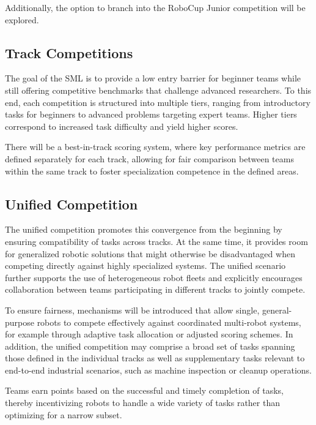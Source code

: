 \documentclass[letterpaper, 11pt]{extarticle}
\begin{document}
Additionally, the option to branch into the RoboCup Junior competition will be explored.

\subsection{Track Competitions}
The goal of the SML is to provide a low entry barrier for beginner teams while still offering competitive benchmarks that challenge advanced researchers. To this end, each competition is structured into multiple tiers, ranging from introductory tasks for beginners to advanced problems targeting expert teams. Higher tiers correspond to increased task difficulty and yield higher scores.

There will be a best-in-track scoring system, where key performance metrics are defined separately for each track, allowing for fair comparison between teams within the same track to foster specialization competence in the defined areas.

\subsection{Unified Competition}

The unified competition promotes this convergence from the beginning by ensuring compatibility of tasks across tracks. At the same time, it provides room for generalized robotic solutions that might otherwise be disadvantaged when competing directly against highly specialized systems. The unified scenario further supports the use of heterogeneous robot fleets and explicitly encourages collaboration between teams participating in different tracks to jointly compete.

To ensure fairness, mechanisms will be introduced that allow single, general-purpose robots to compete effectively against coordinated multi-robot systems, for example through adaptive task allocation or adjusted scoring schemes. In addition, the unified competition may comprise a broad set of tasks spanning those defined in the individual tracks as well as supplementary tasks relevant to end-to-end industrial scenarios, such as machine inspection or cleanup operations.

Teams earn points based on the successful and timely completion of tasks, thereby incentivizing robots to handle a wide variety of tasks rather than optimizing for a narrow subset.

\end{document}
